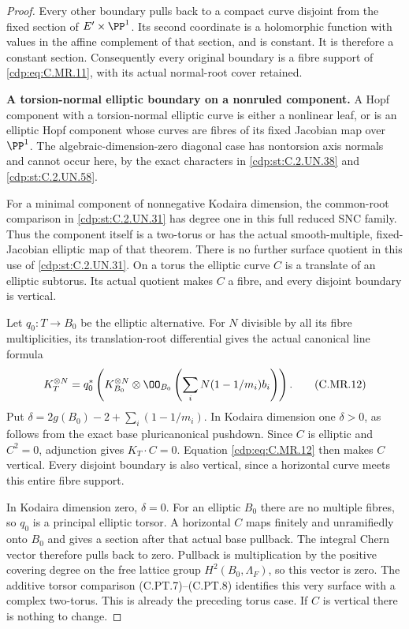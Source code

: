 \begin{proof}
Every other boundary pulls back to a
compact curve disjoint from the fixed
section of $E'\times\PP^1$. Its second
coordinate is a holomorphic function
with values in the affine complement
of that section, and is constant.
It is therefore a constant section.
Consequently every original boundary
is a fibre support of \eqref{cdp:eq:C.MR.11}, with
its actual normal-root cover retained.

\par\medskip\noindent\textbf{A torsion-normal elliptic boundary on a nonruled component.}
A Hopf component with a torsion-normal
elliptic curve is either a nonlinear
leaf, or is an elliptic Hopf component
whose curves are fibres of its fixed
Jacobian map over $\PP^1$. The
algebraic-dimension-zero diagonal case
has nontorsion axis normals and cannot
occur here, by the exact characters
in \ref{cdp:st:C.2.UN.38} and \ref{cdp:st:C.2.UN.58}.

For a minimal component of nonnegative
Kodaira dimension, the common-root
comparison in \ref{cdp:st:C.2.UN.31} has degree one in
this full reduced SNC family. Thus
the component itself is a two-torus
or has the actual smooth-multiple,
fixed-Jacobian elliptic map of that
theorem. There is no further surface
quotient in this use of \ref{cdp:st:C.2.UN.31}.
On a torus the elliptic curve $C$
is a translate of an elliptic subtorus.
Its actual quotient makes $C$ a fibre,
and every disjoint boundary is vertical.

Let $q_0:T\to B_0$ be the elliptic
alternative. For $N$ divisible by
all its fibre multiplicities, its
translation-root differential gives
the actual canonical line formula
\[
 K_T^{\otimes N}
  =q_0^*\left(K_{B_0}^{\otimes N}
       \otimes\OO_{B_0}
          \left(\sum_iN(1-1/m_i)b_i\right)\right).
\tag{C.MR.12}\label{cdp:eq:C.MR.12}
\]
Put $\delta=2g(B_0)-2+\sum_i(1-1/m_i)$.
In Kodaira dimension one $\delta>0$,
as follows from the exact base
pluricanonical pushdown. Since
$C$ is elliptic and $C^2=0$,
adjunction gives $K_T\cdot C=0$.
Equation \eqref{cdp:eq:C.MR.12} then makes $C$
vertical. Every disjoint boundary
is also vertical, since a horizontal
curve meets this entire fibre support.

In Kodaira dimension zero, $\delta=0$.
For an elliptic $B_0$ there are no
multiple fibres, so $q_0$ is a
principal elliptic torsor. A horizontal
$C$ maps finitely and unramifiedly
onto $B_0$ and gives a section after
that actual base pullback. The integral
Chern vector therefore pulls back to
zero. Pullback is multiplication by
the positive covering degree on the
free lattice group $H^2(B_0,\Lambda_F)$,
so this vector is zero. The additive
torsor comparison (C.PT.7)--(C.PT.8)
identifies this very surface with
a complex two-torus. This is already
the preceding torus case. If $C$ is
vertical there is nothing to change.


\end{proof}
